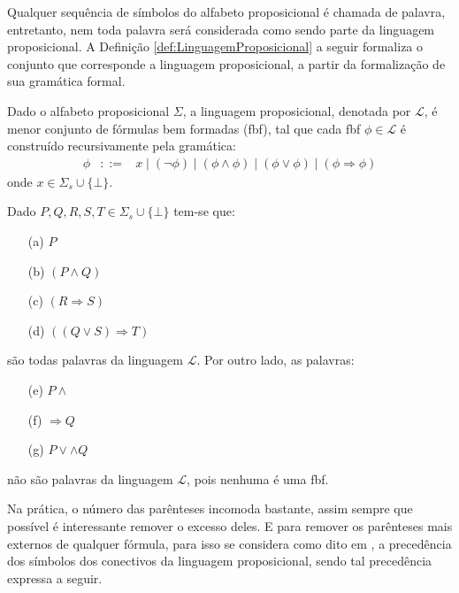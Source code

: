 Qualquer sequência de símbolos do alfabeto proposicional é chamada de palavra, entretanto, nem toda palavra será considerada como sendo parte da linguagem proposicional. A Definição \ref{def:LinguagemProposicional} a seguir formaliza o conjunto que corresponde a linguagem proposicional, a partir da formalização de sua gramática formal.

\begin{definicao}\label{def:LinguagemProposicional}
  Dado o alfabeto proposicional $\Sigma$, a linguagem proposicional, denotada por $\mathcal{L}$, é menor conjunto de fórmulas bem formadas (fbf), tal que cada fbf $\phi \in \mathcal{L}$ é construído recursivamente pela gramática:
  \begin{eqnarray*}
    \phi & ::= & x \mid (\neg \phi) \mid (\phi \land \phi)  \mid (\phi \lor \phi) \mid (\phi \Rightarrow \phi) 
  \end{eqnarray*}
  onde $x \in \Sigma_s \cup \{\bot\}$.
\end{definicao}

\begin{exemplo}\label{exe:PalavrasProposicionaisBemFormadas}
  Dado $P, Q, R, S, T \in \Sigma_s \cup \{\bot\}$ tem-se que:
  \begin{itemize}
      \item[(a)] $P$
      \item[(b)] $(P \land Q)$
      \item[(c)] $(R \Rightarrow S)$
      \item[(d)] $((Q \lor S) \Rightarrow T)$
  \end{itemize}
  são todas palavras da linguagem $\mathcal{L}$. Por outro lado, as palavras:
  \begin{itemize}
      \item[(e)] $P \land$
      \item[(f)] $\Rightarrow Q$
      \item[(g)] $P \lor \land Q$
  \end{itemize}
  não são palavras da linguagem $\mathcal{L}$, pois nenhuma é uma fbf.
\end{exemplo}

Na prática, o número das parênteses incomoda bastante, assim sempre que possível é interessante remover o excesso deles. E para remover os parênteses mais externos de qualquer fórmula, para isso se considera como dito em \cite{stanford-dic-1}, a precedência dos símbolos dos conectivos da linguagem proposicional, sendo tal precedência expressa a seguir. 

